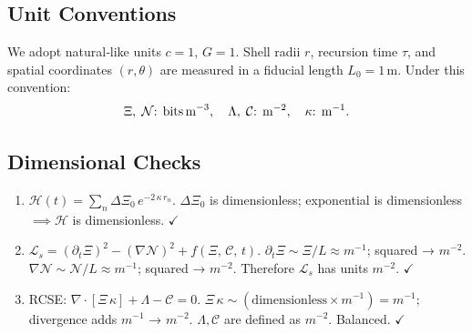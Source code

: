 \documentclass[11pt]{article}
\newcommand{\Contradiction}{\Xi}
\newcommand{\Coherence}{\mathcal{C}}
\newcommand{\Noetic}{\mathcal{N}}
\newcommand{\Leak}{\Lambda}
\newcommand{\Curv}{\kappa}
\newcommand{\Lag}{\mathcal{L}_s}
\newcommand{\Hgain}{\mathcal{H}}
\begin{document}
\subsection{Unit Conventions}
We adopt natural‐like units \(c=1,\,G=1\). Shell radii \(r\), recursion time \(\tau\), and spatial coordinates \((r,\theta)\) are measured in a fiducial length \(L_0 = 1\,\mathrm{m}\). Under this convention:
\[
  \Contradiction,\;\Noetic \text{: bits\,m}^{-3},\quad
  \Leak,\;\Coherence\text{: m}^{-2},\quad
  \Curv\text{: m}^{-1}.
\]

\subsection{Dimensional Checks}
\begin{enumerate}[label=\textbf{\arabic*.},itemsep=2pt]
  \item \(\Hgain(t)=\displaystyle\sum_{n} \Delta\Contradiction_0\,e^{-2\,\Curv\,r_n}.\)  
    \(\Delta\Contradiction_0\) is dimensionless; exponential is dimensionless \(\implies \Hgain\) is dimensionless.  \(\checkmark\)
  \item \(\Lag = (\partial_t \Contradiction)^2 - (\nabla \Noetic)^2 + f(\Contradiction,\,\Coherence,\,t).\)  
    \(\partial_t \Contradiction \sim \Contradiction / L\approx m^{-1}\); squared → \(m^{-2}\).  
    \(\nabla \Noetic \sim \Noetic / L\approx m^{-1}\); squared → \(m^{-2}\).  
    Therefore \(\Lag\) has units \(m^{-2}.\)  \(\checkmark\)
  \item RCSE: \(\nabla\!\cdot[\Contradiction\,\Curv] + \Leak - \Coherence = 0.\)  
    \(\Contradiction\,\Curv \sim (\text{dimensionless} \times m^{-1}) = m^{-1};\) divergence adds \(m^{-1}\) → \(m^{-2}.\)  
    \(\Leak,\Coherence\) are defined as \(m^{-2}.\) Balanced.  \(\checkmark\)
\end{enumerate}
\end{document}
